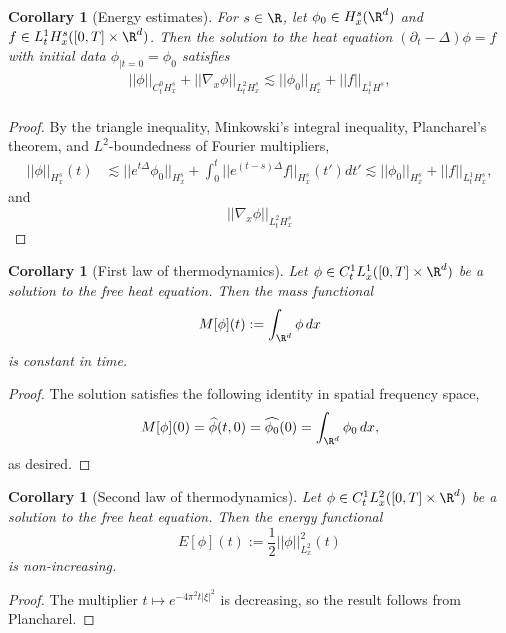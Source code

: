 \documentclass[reqno]{amsart}
\newtheorem{corollary}[theorem]{Corollary}
\theoremstyle{definition}
\theoremstyle{remark}
\begin{document}
\begin{corollary}[Energy estimates]
	For $s \in \R$, let $\phi_0 \in H^s_x (\R^d)$ and $f \in L^1_t H^s_x ([0, T] \times \R^d)$. Then the solution to the heat equation $(\partial_t - \Delta) \phi = f$ with initial data $\phi_{|t = 0} = \phi_0$ satisfies
		\begin{align*}
			|| \phi||_{C^0_t H^s_x} + ||\nabla_x \phi||_{L^2_t H^s_x} \lesssim ||\phi_0||_{H^s_x} + ||f||_{L^1_{t} H^s},\\
		\end{align*}	\label{cor:energy}
\end{corollary}

\begin{proof}
	By the triangle inequality, Minkowski's integral inequality, Plancharel's theorem, and $L^2$-boundedness of Fourier multipliers, 
		\begin{align*}
			 || \phi||_{H^s_x} (t) 
			 	&\lesssim ||e^{t \Delta} \phi_0 ||_{H^s_x} + \int_0^t ||e^{(t - s) \Delta} f||_{H^s_x} (t') dt' \lesssim ||\phi_0||_{H^s_x} + || f||_{L^1_t H^s_x}, 	  
		\end{align*}	 
	and
		\[ ||\nabla_x \phi ||_{L^2_t H^s_x} \]	
\end{proof}

\begin{corollary}[First law of thermodynamics]
	Let $\phi \in C^1_t L^1_x ([0, T] \times \R^d)$ be a solution to the free heat equation. Then the mass functional
		\[ M[\phi](t) := \int_{\R^d} \phi \, dx \]
	is constant in time. 	
\end{corollary}

\begin{proof}
	The solution satisfies the following identity in spatial frequency space, 
		\[ M[\phi](0) = \widehat \phi (t, 0) = \widehat{\phi_0} (0) = \int_{\R^d} \phi_0 \, dx, \]
	as desired. 	
\end{proof}

\begin{corollary}[Second law of thermodynamics]
	Let $\phi \in C^1_t L^2_x ([0, T] \times \R^d)$ be a solution to the free heat equation. Then the energy functional
		\[ E[\phi](t) := \frac12 ||\phi||_{L^2_x}^2 (t) \]
	is non-increasing. 
\end{corollary}

\begin{proof}
	The multiplier $t \mapsto e^{-4\pi^2 t|\xi|^2}$ is decreasing, so the result follows from Plancharel. 
\end{proof}
\end{document}
